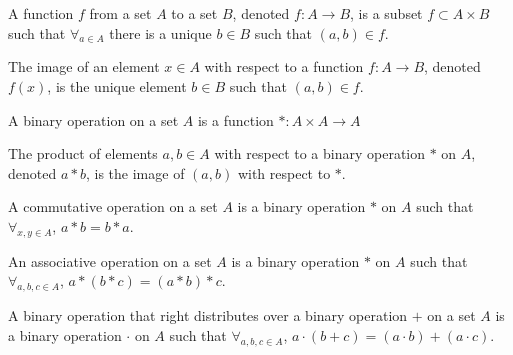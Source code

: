 \documentclass[crop=false,class=book,oneside]{standalone}
\begin{document}
            \begin{definition}
                \label{Definition:MathEnc:Analysis:Sum:Function}
                A function $f$ from a set $A$ to a set $B$,
                denoted $f:A\rightarrow B$,
                is a subset $f\subset A\times B$ such that
                $\forall_{a\in A}$ there is
                a unique $b\in B$ such that $(a,b)\in f$.
            \end{definition}
            \begin{definition}
                \label{Definition:MathEnc:Analysis:Sum:Image}
                The image of an element $x\in A$ with respect to a
                function $f:A\rightarrow B$, denoted $f(x)$, is the
                unique element $b\in B$ such that $(a,b)\in f$.
            \end{definition}
            \begin{definition}
                \label{%
                    Definition:MathEnc:Analysis:Sum:BinaryOperation%
                }
                A binary operation on a set $A$ is a function
                $*:A\times A\rightarrow A$
            \end{definition}
            \begin{definition}
                \label{Definition:MathEnc:Analysis:Sum:Product}
                The product of elements $a,b\in A$ with respect
                to a binary operation
                $*$ on $A$, denoted $a*b$, is the image of $(a,b)$
                with respect to $*$.
            \end{definition}
            \begin{definition}
                \label{%
                    Definition:MathEnc:Analysis:%
                    Sum:CommunativeOperation%
                }
                A commutative operation on a set $A$
                is a binary operation $*$ on $A$
                such that $\forall_{x,y\in A}$, $a*b=b*a$.
            \end{definition}
            \begin{definition}
                \label{%
                    Definition:MathEnc:Analysis:%
                        Sum:AssociativeOperation%
                }
                An associative operation on a set $A$ is a
                binary operation $*$ on $A$
                such that $\forall_{a,b,c\in A}$, $a*(b*c)=(a*b)*c$.
            \end{definition}
            \begin{definition}
                \label{%
                    Definition:MathEnc:Analysis:%
                    Sum:RightDistribute%
                }
                A binary operation that right distributes
                over a binary operation $+$ on
                a set $A$ is a binary operation $\cdot$ on $A$
                such that $\forall_{a,b,c\in A}$,
                $a\cdot (b+c)=(a\cdot b)+(a\cdot c)$.
            \end{definition}
\end{document}
